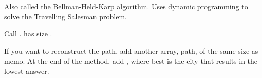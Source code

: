 
Also called the Bellman-Held-Karp algorithm. Uses dynamic programming to solve the Travelling Salesman problem.

Call .  has size \inline{[numCities][1 << numCities]}.



If you want to reconstruct the path, add another array, path, of the same size as memo. At the end of the method, add , where best is the city that results in the lowest answer.



\newpage